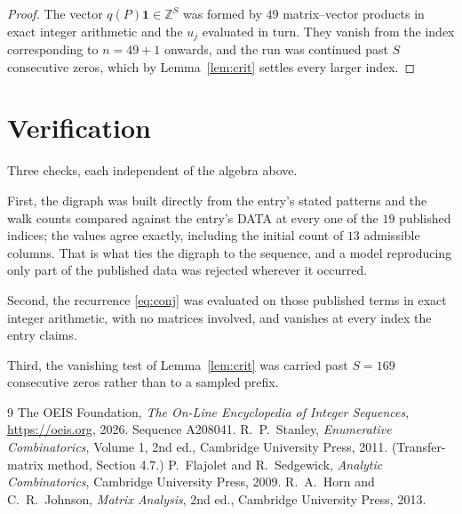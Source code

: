 \documentclass[11pt,a4paper]{article}
\theoremstyle{plain}
\theoremstyle{definition}
\begin{document}
\begin{proof}
The vector $q(P)\mathbf{1}\in\mathbb{Z}^{S}$ was formed by $49$ matrix--vector
products in exact integer arithmetic and the $u_j$ evaluated in turn. They vanish from the
index corresponding to $n=49+1$ onwards, and the run was continued past $S$ consecutive
zeros, which by Lemma~\ref{lem:crit} settles every larger index.
\end{proof}

\section{Verification}

Three checks, each independent of the algebra above.

First, the digraph was built directly from the entry's stated patterns and the walk counts
compared against the entry's DATA at every one of the $19$ published indices; the
values agree exactly, including the initial count of $13$ admissible columns. That is
what ties the digraph to the sequence, and a model reproducing only part of the published
data was rejected wherever it occurred.

Second, the recurrence \eqref{eq:conj} was evaluated on those published terms in exact
integer arithmetic, with no matrices involved, and vanishes at every index the entry claims.

Third, the vanishing test of Lemma~\ref{lem:crit} was carried past $S=169$ consecutive
zeros rather than to a sampled prefix.

\begin{thebibliography}{9}
 The OEIS Foundation, \emph{The On-Line Encyclopedia of Integer
Sequences}, \url{https://oeis.org}, 2026. Sequence A208041.
 R.~P.~Stanley, \emph{Enumerative Combinatorics}, Volume 1, 2nd ed.,
Cambridge University Press, 2011. (Transfer-matrix method, Section 4.7.)
 P.~Flajolet and R.~Sedgewick, \emph{Analytic Combinatorics}, Cambridge
University Press, 2009.
 R.~A.~Horn and C.~R.~Johnson, \emph{Matrix Analysis}, 2nd ed., Cambridge
University Press, 2013.
\end{thebibliography}
\end{document}
